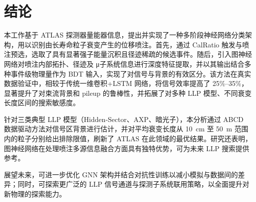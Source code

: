 
\chapter{结论}
本工作基于 ATLAS 探测器量能器信息，提出并实现了一种多阶段神经网络分类架构，用以识别由长寿命粒子衰变产生的位移喷注。首先，通过 CalRatio 触发与喷注预选，选取了具有显著强子能量沉积且径迹稀疏的候选事件。随后，引入图神经网络对喷注内部拓扑、径迹及 μ子系统信息进行深度特征提取，并以其输出结合多种事件级物理量作为 BDT 输入，实现了对信号与背景的有效区分。该方法在真实数据验证中，相较于传统一维卷积+LSTM 网络，将信号效率提高了 25\%–35\%，显著提升了对束流背景和 pileup 的鲁棒性，并拓展了对多种 LLP 模型、不同衰变长度区间的搜索敏感度。

针对三类典型 LLP 模型（Hidden‐Sector、AXP、暗光子），本分析通过 ABCD 数据驱动方法对信号区背景进行估计，并对平均衰变长度从 10 cm 至 50 m 范围内的粒子分别给出排除限值，刷新了 ATLAS 在此领域的最优结果。研究还表明，图神经网络在处理喷注多源信息融合方面具有独特优势，可为未来 LLP 搜索提供参考。

展望未来，可进一步优化 GNN 架构并结合对抗性训练以减小模拟与数据间的差异；同时，可探索更广泛的 LLP 信号通道与探测子系统联用策略，以全面提升对新物理的探索能力。
